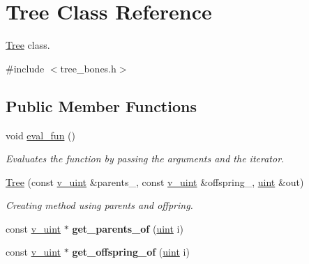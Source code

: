 \hypertarget{classTree}{}\section{Tree Class Reference}
\label{classTree}


\hyperlink{classTree}{Tree} class.  




{\ttfamily \#include $<$tree\+\_\+bones.\+h$>$}

\subsection*{Public Member Functions}
\begin{DoxyCompactItemize}
\item 
void \hyperlink{classTree_a5a24565d179a3bd6edae1ff323060a93}{eval\+\_\+fun} ()\hypertarget{classTree_a5a24565d179a3bd6edae1ff323060a93}{}\label{classTree_a5a24565d179a3bd6edae1ff323060a93}

\begin{DoxyCompactList}\small\item\em Evaluates the function by passing the arguments and the iterator. \end{DoxyCompactList}\item 
\hyperlink{classTree_a0f964d9ba9834822d3e18946a5361839}{Tree} (const \hyperlink{typedefs_8h_ad56dde311aef1af823f4351451e8a381}{v\+\_\+uint} \&parents\+\_\+, const \hyperlink{typedefs_8h_ad56dde311aef1af823f4351451e8a381}{v\+\_\+uint} \&offspring\+\_\+, \hyperlink{typedefs_8h_a91ad9478d81a7aaf2593e8d9c3d06a14}{uint} \&out)
\begin{DoxyCompactList}\small\item\em Creating method using parents and offpring. \end{DoxyCompactList}\item 
const \hyperlink{typedefs_8h_ad56dde311aef1af823f4351451e8a381}{v\+\_\+uint} $\ast$ {\bfseries get\+\_\+parents\+\_\+of} (\hyperlink{typedefs_8h_a91ad9478d81a7aaf2593e8d9c3d06a14}{uint} i)\hypertarget{classTree_adb9bede67bc875b58bb240d4c5421821}{}\label{classTree_adb9bede67bc875b58bb240d4c5421821}

\item 
const \hyperlink{typedefs_8h_ad56dde311aef1af823f4351451e8a381}{v\+\_\+uint} $\ast$ {\bfseries get\+\_\+offspring\+\_\+of} (\hyperlink{typedefs_8h_a91ad9478d81a7aaf2593e8d9c3d06a14}{uint} i)\hypertarget{classTree_a02c43c8a0bb0e7be7bf33436a8c05b30}{}\label{classTree_a02c43c8a0bb0e7be7bf33436a8c05b30}


\end{DoxyCompactItemize}
